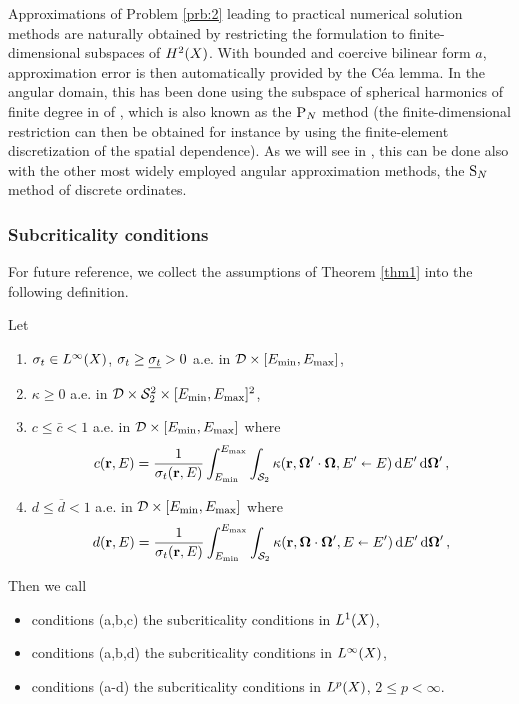 Approximations of Problem \ref{prb:2} leading to practical numerical solution methods are naturally obtained by
restricting the formulation to finite-dimensional subspaces of $\Hp[2](X)$. With bounded and coercive bilinear form $a$,
approximation error is then automatically provided by the C{\' e}a lemma. In the angular domain, this has
been done using the subspace of spherical harmonics of finite degree in \cite{bourhrara3} of \cite{Manteuffel}, which
is also known as the $\PN$ method (the finite-dimensional restriction can then be obtained for instance by using the
finite-element discretization of the spatial dependence). As we will see in , this can be done also with
the other most widely employed angular approximation methods, the $\SN$ method of discrete ordinates.

\subsubsection{Subcriticality conditions}
For future reference, we collect the assumptions of Theorem \ref{thm1} into the following definition.
\begin{definition}\label{def:subcriticality}
	Let 
	\begin{enumerate}[label=(\alph*)]
	\item $\sigma_t \in \Lp[\infty](X)$, $\sigma_t \geq \mst > 0$ a.e. in $\VV\times[\Emin,\Emax]$,
	\item $\kappa \geq 0$ a.e. in $\VV\times\Sphere^2\times[\Emin,\Emax]^2$,
	\item $\displaystyle c \leq \bar c < 1$ a.e. in $\VV\times[\Emin,\Emax]$ where
	  \begin{equation*}
	    c(\br,E) = \frac{1}{\sigma_t(\br,E)}\int_{\Emin}^{\Emax}\int_{\Sphere} \kappa(\br,\bomega'\cdot\bomega,
	    E'\sla E)\,\d{E'}\d{\bomega'},
	  \end{equation*}
	 \item $d \leq \overline d < 1$ a.e. in $\VV\times[\Emin,\Emax]$ where
	 $$
	 d(\br,E) = 
  		\frac{1}{\sigma_t(\br,E)}\int_{\Emin}^{\Emax}\int_{\Sphere} \kappa(\br,\bomega\cdot\bomega',
	    E\sla E')\,\d{E'}\d{\bomega'},
	 $$
	\end{enumerate}
	Then we call
	\begin{itemize}
  \item conditions (a,b,c) the subcriticality conditions in $\Lp[1](X)$,
  \item conditions (a,b,d) the subcriticality conditions in $\Lp[\infty](X)$,
  \item conditions (a-d) the subcriticality conditions in $\Lp(X)$, $2\leq p < \infty$.
\end{itemize}
\end{definition}

